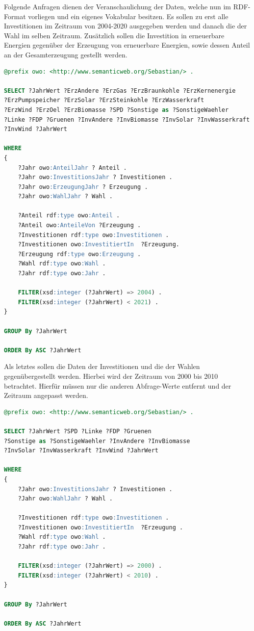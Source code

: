 \documentclass[12pt]{article}
\begin{document}
Folgende Anfragen dienen der Veranschaulichung der Daten, welche nun im RDF-Format vorliegen und ein eigenes Vokabular besitzen. Es sollen zu erst alle Investitionen im Zeitraum von 2004-2020 ausgegeben werden und danach die der Wahl im selben Zeitraum. Zusätzlich sollen die Investition in erneuerbare Energien gegenüber der Erzeugung von erneuerbare Energien, sowie dessen Anteil an der Gesamterzeugung gestellt werden.

\begin{lstlisting}[language=sql]
@prefix owo: <http://www.semanticweb.org/Sebastian/> .

SELECT ?JahrWert ?ErzAndere ?ErzGas ?ErzBraunkohle ?ErzKernenergie
?ErzPumpspeicher ?ErzSolar ?ErzSteinkohle ?ErzWasserkraft
?ErzWind ?ErzOel ?ErzBiomasse ?SPD ?Sonstige as ?SonstigeWaehler
?Linke ?FDP ?Gruenen ?InvAndere ?InvBiomasse ?InvSolar ?InvWasserkraft
?InvWind ?JahrWert

WHERE
{
	?Jahr owo:AnteilJahr ? Anteil .
	?Jahr owo:InvestitionsJahr ? Investitionen .
	?Jahr owo:ErzeugungJahr ? Erzeugung .
	?Jahr owo:WahlJahr ? Wahl .
	
	?Anteil rdf:type owo:Anteil .
	?Anteil owo:AnteileVon ?Erzeugung .
	?Investitionen rdf:type owo:Investitionen .
	?Investitionen owo:InvestitiertIn  ?Erzeugung.
	?Erzeugung rdf:type owo:Erzeugung .
	?Wahl rdf:type owo:Wahl .
	?Jahr rdf:type owo:Jahr .
	
	FILTER(xsd:integer (?JahrWert) => 2004) . 
	FILTER(xsd:integer (?JahrWert) < 2021) .
}

GROUP By ?JahrWert

ORDER By ASC ?JahrWert
\end{lstlisting}

Als letztes sollen die Daten der Investitionen und die der Wahlen gegenübergestellt werden. Hierbei wird der Zeitraum von 2000 bis 2010 betrachtet. Hierfür müssen nur die anderen Abfrage-Werte entfernt und der Zeitraum angepasst werden.

\begin{lstlisting}[language=sql]
@prefix owo: <http://www.semanticweb.org/Sebastian/> .

SELECT ?JahrWert ?SPD ?Linke ?FDP ?Gruenen 
?Sonstige as ?SonstigeWaehler ?InvAndere ?InvBiomasse 
?InvSolar ?InvWasserkraft ?InvWind ?JahrWert

WHERE
{
	?Jahr owo:InvestitionsJahr ? Investitionen .
	?Jahr owo:WahlJahr ? Wahl .

	?Investitionen rdf:type owo:Investitionen .
	?Investitionen owo:InvestitiertIn  ?Erzeugung .
	?Wahl rdf:type owo:Wahl .
	?Jahr rdf:type owo:Jahr .
	
	FILTER(xsd:integer (?JahrWert) => 2000) . 
	FILTER(xsd:integer (?JahrWert) < 2010) .
}

GROUP By ?JahrWert

ORDER By ASC ?JahrWert
\end{lstlisting}
\end{document}

